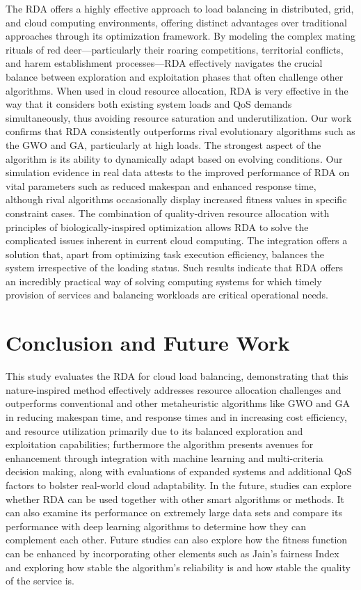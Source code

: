 \documentclass[pdflatex,sn-mathphys-num]{sn-jnl}%
\theoremstyle{thmstyleone}%
\theoremstyle{thmstyletwo}%
\theoremstyle{thmstylethree}%
\begin{document}
The RDA offers a highly effective approach to load balancing in distributed, grid, and cloud computing environments, offering distinct advantages over traditional approaches through its optimization framework. By modeling the complex mating rituals of red deer—particularly their roaring competitions, territorial conflicts, and harem establishment processes—RDA effectively navigates the crucial balance between exploration and exploitation phases that often challenge other algorithms. When used in cloud resource allocation, RDA is very effective in the way that it considers both existing system loads and QoS demands simultaneously, thus avoiding resource saturation and underutilization.
Our work confirms that RDA consistently outperforms rival evolutionary algorithms such as the GWO and GA, particularly at high loads. The strongest aspect of the algorithm is its ability to dynamically adapt based on evolving conditions. Our simulation evidence in real data attests to the improved performance of RDA on vital parameters such as reduced makespan and enhanced response time, although rival algorithms occasionally display increased fitness values in specific constraint cases.
The combination of quality-driven resource allocation with principles of biologically-inspired optimization allows RDA to solve the complicated issues inherent in current cloud computing. The integration offers a solution that, apart from optimizing task execution efficiency, balances the system irrespective of the loading status. Such results indicate that RDA offers an incredibly practical way of solving computing systems for which timely provision of services and balancing workloads are critical operational needs.



\section{Conclusion and Future Work}\label{sec7}

This study evaluates the RDA for cloud load balancing, demonstrating that this nature-inspired method effectively addresses resource allocation challenges and outperforms conventional and other metaheuristic algorithms like GWO and GA in reducing makespan time, and response times and in increasing cost efficiency, and resource utilization primarily due to its balanced exploration and exploitation capabilities; furthermore the algorithm presents avenues for enhancement through integration with machine learning and multi-criteria decision making, along with evaluations of expanded systems and additional QoS factors to bolster real-world cloud adaptability.
In the future, studies can explore whether RDA can be used together with other smart algorithms or methods. It can also examine its performance on extremely large data sets and compare its performance with deep learning algorithms to determine how they can complement each other. Future studies can also explore how the fitness function can be enhanced by incorporating other elements such as Jain's fairness Index \cite{Jain_fairness_index} and exploring how stable the algorithm's reliability is and how stable the quality of the service is.
\end{document}
